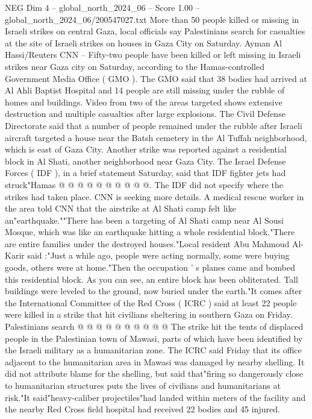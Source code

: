 \begin{textsample}{NEG Dim 4 – global\_north\_2024\_06 – Score 1.00 – global\_north\_2024\_06/200547027.txt}  \label{ex:f4_neg_314}
More than 50 people killed or missing in Israeli strikes on central Gaza, local officials say Palestinians search for casualties at the site of Israeli strikes on houses in Gaza City on Saturday.
Ayman Al Hassi/Reuters CNN -- Fifty-two people have been killed or left missing in Israeli strikes near Gaza city on Saturday, according to the Hamas-controlled Government Media Office ( GMO ).
The GMO said that 38 bodies had arrived at Al Ahli Baptist Hospital and 14 people are still missing under the rubble of homes and buildings.
Video from two of the areas targeted shows extensive destruction and multiple casualties after large explosions.
The Civil Defense Directorate said that a number of people remained under the rubble after Israeli aircraft targeted a house near the Batsh cemetery in the Al Tuffah neighborhood, which is east of Gaza City.
Another strike was reported against a residential block in Al Shati, another neighborhood near Gaza City.
The Israel Defense Forces ( IDF ), in a brief statement Saturday, said that IDF fighter jets had struck"Hamas @ @ @ @ @ @ @ @ @ @.
The IDF did not specify where the strikes had taken place.
CNN is seeking more details.
A medical rescue worker in the area told CNN that the airstrike at Al Shati camp felt like an"earthquake.""There has been a targeting of Al Shati camp near Al Sousi Mosque, which was like an earthquake hitting a whole residential block."There are entire families under the destroyed houses."Local resident Abu Mahmoud Al-Karir said :"Just a while ago, people were acting normally, some were buying goods, others were at home."Then the occupation ' s planes came and bombed this residential block.
As you can see, an entire block has been obliterated.
Tall buildings were leveled to the ground, now buried under the earth."It comes after the International Committee of the Red Cross ( ICRC ) said at least 22 people were killed in a strike that hit civilians sheltering in southern Gaza on Friday.
Palestinians search @ @ @ @ @ @ @ @ @ @ The strike hit the tents of displaced people in the Palestinian town of Mawasi, parts of which have been identified by the Israeli military as a humanitarian zone.
The ICRC said Friday that its office adjacent to the humanitarian area in Mawasi was damaged by nearby shelling.
It did not attribute blame for the shelling, but said that"firing so dangerously close to humanitarian structures puts the lives of civilians and humanitarians at risk."It said"heavy-caliber projectiles"had landed within meters of the facility and the nearby Red Cross field hospital had received 22 bodies and 45 injured.

\end{textsample}
